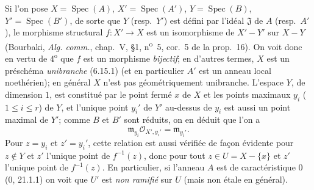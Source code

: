 \begin{env}[21.13.9]
Si l'on pose $X=\operatorname{Spec}(A)$, $X'=\operatorname{Spec}(A')$,
$Y=\operatorname{Spec}(B)$, $Y'=\operatorname{Spec}(B')$, de sorte que $Y$
(resp.\ $Y'$) est défini par l'idéal $\mathfrak J$ de $A$ (resp.\ $A'$), le morphisme
structural $f:X'\to X$ est un isomorphisme de $X'-Y'$ sur $X-Y$ (Bourbaki,
\emph{Alg. comm.}, chap.~V, \S1, n\textsuperscript{o}~5, cor.~5 de la prop.~16). On
voit donc en vertu de $4^{\mathrm o}$ que $f$ est un morphisme \emph{bijectif}; en
d'autres termes, $X$ est un préschéma \emph{unibranche} (6.15.1) (et en particulier
$A'$ est un anneau local noethérien); en général $X$ n'est pas géométriquement
unibranche. L'espace $Y$, de dimension $1$, est constitué par le point fermé $x$ de
$X$ et les points maximaux $y_i$ ($1\leq i\leq r$) de $Y$, et l'unique point $y_i'$
de $Y'$ au-dessus de $y_i$ est aussi un point maximal de $Y'$; comme $B$ et $B'$ sont
réduits, on en déduit que l'on a
\[
  \mathfrak m_{y_i}\mathcal O_{X',y_i'}=\mathfrak m_{y_i'}.
\]
Pour $z=y_i$ et $z'=y_i'$, cette relation est aussi vérifiée de façon évidente pour
$z\notin Y$ et $z'$ l'unique point de $f^{-1}(z)$, donc pour tout
$z\in U=X-\{x\}$ et $z'$ l'unique point de $f^{-1}(z)$. En particulier, si l'anneau
$A$ est de caractéristique $0$ (0, 21.1.1) on voit que $U'$ est \emph{non ramifié} sur
$U$ (mais non étale en général).


\end{env}
